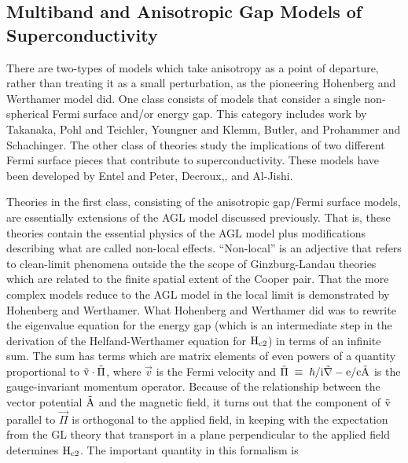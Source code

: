 \subsection{Multiband and Anisotropic Gap Models of Superconductivity}
\label{multiband}

        There are  two-types of models which  take anisotropy as a point of
departure,  rather  than  treating   it as  a  small  perturbation,  as the
pioneering  Hohenberg and Werthamer  model did.\cite{hohenberg67} One class
consists  of models   that consider a   single non-spherical  Fermi surface
and/or    energy     gap.     This      category    includes     work    by
Takanaka,\cite{takanaka75} Pohl  and    Teichler,\cite{pohl76} Youngner and
Klemm,\cite{youngner80}    Butler,\cite{butler80}     and   Prohammer   and
Schachinger.\cite{prohammer87}  The  other   class  of theories  study  the
implications of  two different  Fermi   surface pieces that  contribute  to
superconductivity.  These models    have  been  developed   by  Entel   and
Peter,\cite{entel76,entel77}          Decroux,\cite{decroux80},         and
Al-Jishi\cite{M143}.

        Theories   in  the   first class, consisting   of  the  anisotropic
gap/Fermi surface  models,  are essentially extensions   of the  AGL  model
discussed   previously.   That   is, these theories  contain  the essential
physics  of  the AGL model  plus  modifications  describing what are called
non-local  effects.    ``Non-local''   is an   adjective that     refers to
clean-limit  phenomena outside  the the   scope of Ginzburg-Landau theories
which  are  related  to the    finite   spatial extent   of   the    Cooper
pair.\cite{tinkham80} That the more complex models reduce to  the AGL model
in   the      local     limit   is   demonstrated   by      Hohenberg   and
Werthamer.\cite{hohenberg67}  What Hohenberg and    Werthamer  did  was  to
rewrite  the  eigenvalue   equation   for  the  energy   gap  (which is  an
intermediate step in the  derivation of the  Helfand-Werthamer equation for
$\rm  H_{c2}$) in terms  of an infinite sum.   The sum has terms which  are
matrix elements of even powers  of a quantity  proportional to $\rm \vec{v}
\cdot \vec{\Pi}$, where $\vec{v}$ is  the Fermi velocity and $\rm \vec{\Pi}
\; \equiv \; \hbar/i \vec{\nabla} - e/c
\vec{A}$  is  the  gauge-invariant   momentum   operator.  Because  of  the
relationship between  the vector potential  $\rm \vec{A}$ and  the magnetic
field,  it   turns out   that  the component  of $\rm \vec{v}$  parallel to
$\vec{\Pi}$  is   orthogonal to  the applied  field,   in  keeping with the
expectation from the GL  theory that transport in  a plane perpendicular to
the applied field determines $\rm H_{c2}$.  The important  quantity in this
formalism is

